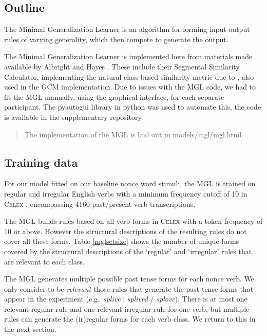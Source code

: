 \documentclass[12pt]{article}
\begin{document}
\subsection{Outline}

The Minimal Generalization Learner is an algorithm for forming input-output rules of varying generality, which then compete to generate the output. 

The Minimal Generalization Learner is implemented here from materials made available by Albright and Hayes \citep{albright2003rules}. These include their Segmental Similarity Calculator, implementing the natural class based similarity metric due to \cite{frisch1997similarity}, also used in the GCM implementation. Due to issues with the MGL code, we had to fit the MGL manually, using the graphical interface, for each separate participant. The pyautogui library in python was used to automate this, the code is available in the supplementary repository.

\begin{quote}
The implementation of the MGL is laid out in models/mgl/mgl.html.
\end{quote}

\subsection{Training data}

For our model fitted on our baseline nonce word stimuli, the MGL is trained on regular and irregular English verbs with a minimum frequency cutoff of 10 in \textsc{Celex} \citep{baayen1993celex}, encompassing 4160 past/present verb transcriptions. 

The MGL builds rules based on all verb forms in \textsc{Celex} with a token frequency of 10 or above. However the structural descriptions of the resulting rules do not cover all these forms. Table \ref{mglsetsize} shows the number of unique forms covered by the structural descriptions of the `regular' and `irregular' rules that are relevant to each class. 

The MGL generates multiple possible past tense forms for each nonce verb. We only consider to be {\em relevant} those rules that generate the past tense forms that appear in the experiment (e.g.\ {\em splive} : {\em splived} / {\em splove}). There is at most one relevant regular rule and one relevant irregular rule for one verb, but multiple rules can generate the (ir)regular forms for each verb class. We return to this in the next section.
\end{document}
